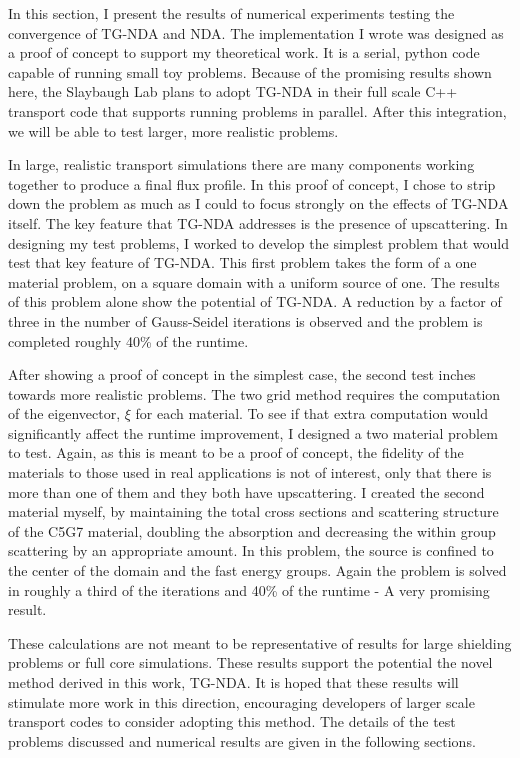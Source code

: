 
In this section, I present the results of numerical experiments testing the convergence of TG-NDA and NDA. The implementation I wrote was designed as a proof of concept to support my theoretical work. It is a serial, python code capable of running small toy problems. Because of the promising results shown here, the Slaybaugh Lab plans to adopt TG-NDA in their full scale C++ transport code that supports running problems in parallel. After this integration, we will be able to test larger, more realistic problems.

In large, realistic transport simulations there are many components working together to produce a final flux profile. In this proof of concept, I chose to strip down the problem as much as I could to focus strongly on the effects of TG-NDA itself. The key feature that TG-NDA addresses is the presence of upscattering. In designing my test problems, I worked to develop the simplest problem that would test that key feature of TG-NDA. This first problem takes the form of a one material problem, on a square domain with a uniform source of one. The results of this problem alone show the potential of TG-NDA. A reduction by a factor of three in the number of Gauss-Seidel iterations is observed and the problem is completed roughly 40\% of the runtime. 

After showing a proof of concept in the simplest case, the second test inches towards more realistic problems. The two grid method requires the computation of the eigenvector, $\xi$ for each material. To see if that extra computation would significantly affect the runtime improvement, I designed a two material problem to test. Again, as this is meant to be a proof of concept, the fidelity of the materials to those used in real applications is not of interest, only that there is more than one of them and they both have upscattering. I created the second material myself, by maintaining the total cross sections and scattering structure of the C5G7 material, doubling the absorption and decreasing the within group scattering by an appropriate amount. In this problem, the source is confined to the center of the domain and the fast energy groups. Again the problem is solved in roughly a third of the iterations and 40\% of the runtime - A very promising result. 

These calculations are not meant to be representative of results for large shielding problems or full core simulations. These results support the potential the novel method derived in this work, TG-NDA. It is hoped that these results will stimulate more work in this direction, encouraging developers of larger scale transport codes to consider adopting this method. The details of the test problems discussed and numerical results are given in the following sections. 


